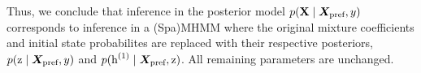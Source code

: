 Thus, we conclude that inference in the posterior model $p({\mathbf{X}} \mid {\bm{X}}_\text{pref}, y)$ corresponds to inference in a (Spa)MHMM where the original mixture coefficients and initial state probabilites are replaced with their respective posteriors, $p({\textnormal{z}} \mid {\bm{X}}_\text{pref}, y)$ and $p({\textnormal{h}}^{(1)} \mid {\bm{X}}_\text{pref}, {\textnormal{z}})$. All remaining parameters are unchanged.